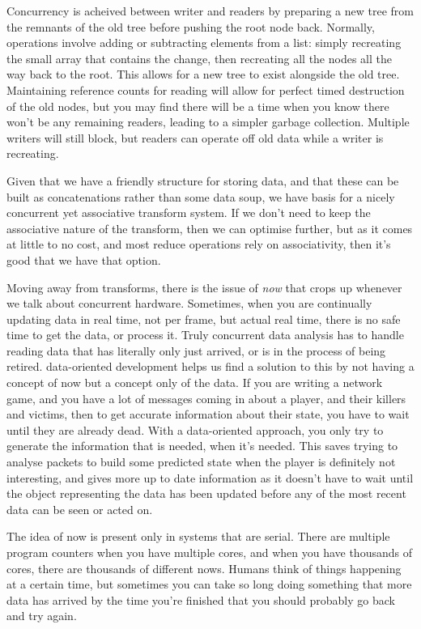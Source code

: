 Concurrency is acheived between writer and readers by preparing a new tree from
the remnants of the old tree before pushing the root node back. Normally,
operations involve adding or subtracting elements from a list: simply
recreating the small array that contains the change, then recreating all the
nodes all the way back to the root. This allows for a new tree to exist
alongside the old tree. Maintaining reference counts for reading will allow for
perfect timed destruction of the old nodes, but you may find there will be a
time when you know there won't be any remaining readers, leading to a simpler
garbage collection. Multiple writers will still block, but readers can operate
off old data while a writer is recreating.

Given that we have a friendly structure for storing data, and that these can be
built as concatenations rather than some data soup, we have basis for a nicely
concurrent yet associative transform system. If we don't need to keep the
associative nature of the transform, then we can optimise further, but as it
comes at little to no cost, and most reduce operations rely on associativity,
then it's good that we have that option.

Moving away from transforms, there is the issue of \emph{now} that crops up whenever
we talk about concurrent hardware. Sometimes, when you are continually updating
data in real time, not per frame, but actual real time, there is no safe time to
get the data, or process it. Truly concurrent data analysis has to handle
reading data that has literally only just arrived, or is in the process of
being retired. data-oriented development helps us find a solution to this by
not having a concept of now but a concept only of the data. If you are writing
a network game, and you have a lot of messages coming in about a player, and
their killers and victims, then to get accurate information about their state,
you have to wait until they are already dead. With a data-oriented approach,
you only try to generate the information that is needed, when it's needed. This
saves trying to analyse packets to build some predicted state when the player
is definitely not interesting, and gives more up to date information as it
doesn't have to wait until the object representing the data has been updated
before any of the most recent data can be seen or acted on.

The idea of now is present only in systems that are serial. There are multiple
program counters when you have multiple cores, and when you have thousands of
cores, there are thousands of different nows. Humans think of things happening
at a certain time, but sometimes you can take so long doing something that more
data has arrived by the time you're finished that you should probably go back
and try again.

